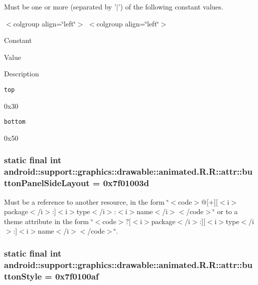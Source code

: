 Must be one or more (separated by '$|$') of the following constant values. \begin{TabularC}{0}
\hline
\end{TabularC}
$<$colgroup align=\char`\"{}left\char`\"{}$>$ $<$colgroup align=\char`\"{}left\char`\"{}$>$ 

Constant

Value

Description 

{\tt top}

0x30

{\tt bottom}

0x50\hypertarget{classandroid_1_1support_1_1graphics_1_1drawable_1_1animated_1_1_r_1_1attr_e08bed35d52498cf488ee73d8709f60a}{
\subsubsection[{buttonPanelSideLayout}]{\setlength{\rightskip}{0pt plus 5cm}static final int android::support::graphics::drawable::animated.R.R::attr::buttonPanelSideLayout = 0x7f01003d}}
\label{classandroid_1_1support_1_1graphics_1_1drawable_1_1animated_1_1_r_1_1attr_e08bed35d52498cf488ee73d8709f60a}


Must be a reference to another resource, in the form \char`\"{}$<$code$>$@\mbox{[}+\mbox{]}\mbox{[}$<$i$>$package$<$/i$>$:\mbox{]}$<$i$>$type$<$/i$>$:$<$i$>$name$<$/i$>$$<$/code$>$\char`\"{} or to a theme attribute in the form \char`\"{}$<$code$>$?\mbox{[}$<$i$>$package$<$/i$>$:\mbox{]}\mbox{[}$<$i$>$type$<$/i$>$:\mbox{]}$<$i$>$name$<$/i$>$$<$/code$>$\char`\"{}. \hypertarget{classandroid_1_1support_1_1graphics_1_1drawable_1_1animated_1_1_r_1_1attr_1539cbdc86de5ff2bd5e8634e286c684}{
\subsubsection[{buttonStyle}]{\setlength{\rightskip}{0pt plus 5cm}static final int android::support::graphics::drawable::animated.R.R::attr::buttonStyle = 0x7f0100af}}
\label{classandroid_1_1support_1_1graphics_1_1drawable_1_1animated_1_1_r_1_1attr_1539cbdc86de5ff2bd5e8634e286c684}



